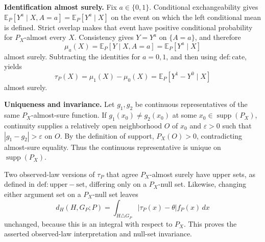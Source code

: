 \textbf{Identification almost surely.} Fix \(a\in\{0,1\}\). Conditional exchangeability gives \(\mathbb E_P[Y^a\mid X,A=a]=\mathbb E_P[Y^a\mid X]\) on the event on which the left conditional mean is defined. Strict overlap makes that event have positive conditional probability for \(P_X\)-almost every \(X\). Consistency gives \(Y=Y^a\) on \(\{A=a\}\), and therefore
\[
\mu_a(X)=\mathbb E_P[Y\mid X,A=a]=\mathbb E_P[Y^a\mid X]
\]
almost surely. Subtracting the identities for \(a=0,1\), and then using \(\mathrm{def:cate}\), yields
\[
\tau_P(X)=\mu_1(X)-\mu_0(X)=\mathbb E_P[Y^1-Y^0\mid X]
\]
almost surely.

\textbf{Uniqueness and invariance.} Let \(g_1,g_2\) be continuous representatives of the same \(P_X\)-almost-sure function. If \(g_1(x_0)\ne g_2(x_0)\) at some \(x_0\in\operatorname{supp}(P_X)\), continuity supplies a relatively open neighborhood \(O\) of \(x_0\) and \(\varepsilon>0\) such that \(|g_1-g_2|>\varepsilon\) on \(O\). By the definition of support, \(P_X(O)>0\), contradicting almost-sure equality. Thus the continuous representative is unique on \(\operatorname{supp}(P_X)\).

Two observed-law versions of \(\tau_P\) that agree \(P_X\)-almost surely have upper sets, as defined in \(\mathrm{def:upper-set}\), differing only on a \(P_X\)-null set. Likewise, changing either argument set on a \(P_X\)-null set leaves
\[
d_H(H,G_P;P)=\int_{H\triangle G_P}|\tau_P(x)-\theta|f_P(x)\,dx
\]
unchanged, because this is an integral with respect to \(P_X\). This proves the asserted observed-law interpretation and null-set invariance.